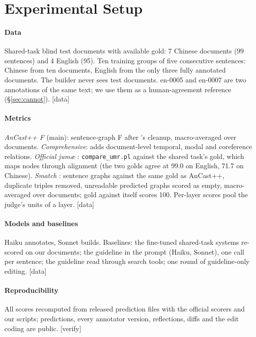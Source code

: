 \documentclass[11pt]{article}
\newcommand{\jumach}{ju\textlengthmark{}m\ae{}\textteshlig{}\xspace}
\newcommand{\stag}[2]{\textcolor{#1}{\textsf{\scriptsize[#2]}}}
\newcommand{\HAVE}{\stag{green!50!black}{data}\xspace}
\newcommand{\CHK}{\stag{orange!80!black}{verify}\xspace}
\begin{document}
\section{Experimental Setup}
\label{sec:setup}

\paragraph{Data}
Shared-task blind test documents with available gold: 7 Chinese documents (99 sentences) and 4 English (95). Ten training groups of five consecutive sentences: Chinese from ten documents, English from the only three fully annotated documents. The builder never sees test documents. en-0005 and en-0007 are two annotations of the same text; we use them as a human-agreement reference (\S\ref{sec:cannot}). \HAVE

\paragraph{Metrics}
\emph{AnCast++ F} (main): sentence-graph F after \citet{chun2024pipeline}'s cleanup, macro-averaged over documents. \emph{Comprehensive}: adds document-level temporal, modal and coreference relations. \emph{Official \jumach} \citep{stepanek2026first,zeman2026word}: \texttt{compare\_umr.pl} against the shared task's gold, which maps nodes through alignment (the two golds agree at 99.0 on English, 71.7 on Chinese). \emph{Smatch} \citep{cai2013smatch}: sentence graphs against the same gold as AnCast++, duplicate triples removed, unreadable predicted graphs scored as empty, macro-averaged over documents; gold against itself scores 100. Per-layer scores pool the judge's units of a layer. \HAVE

\paragraph{Models and baselines}
Haiku annotates, Sonnet builds. Baselines: the fine-tuned shared-task systems re-scored on our documents; the guideline in the prompt (Haiku, Sonnet), one call per sentence; the guideline read through search tools; one round of guideline-only editing. \HAVE

\paragraph{Reproducibility}
All scores recomputed from released prediction files with the official scorers and our scripts; predictions, every annotator version, reflections, diffs and the edit coding are public. \CHK
\end{document}
